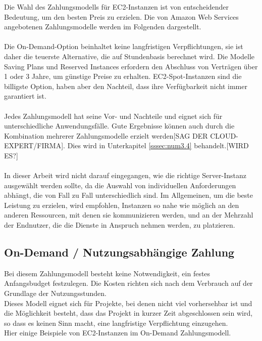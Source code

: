 Die Wahl des Zahlungsmodells für EC2-Instanzen ist von entscheidender Bedeutung, um den besten Preis zu erzielen.
Die von Amazon Web Services angebotenen Zahlungsmodelle werden im Folgenden dargestellt.
\\\\
Die On-Demand-Option %
beinhaltet keine langfristigen Verpflichtungen, sie ist daher die teuerste Alternative, die auf Stundenbasis berechnet wird. Die Modelle Saving Plans und Reserved Instances erfordern den Abschluss von Verträgen über 1 oder 3 Jahre, um günstige Preise zu erhalten. EC2-Spot-Instanzen sind die billigste Option, haben aber den Nachteil, dass ihre Verfügbarkeit nicht immer garantiert ist.
\\\\
Jedes Zahlungsmodell hat seine Vor- und Nachteile und eignet sich für unterschiedliche Anwendungsfälle. Gute Ergebnisse können auch durch die Kombination mehrerer Zahlungsmodelle erzielt werden[SAG DER CLOUD-EXPERT/FIRMA]. Dies wird in Unterkapitel \ref{sssec:num3.4} behandelt.[WIRD ES?]
\\\\
In dieser Arbeit wird nicht darauf eingegangen, wie die richtige Server-Instanz ausgewählt werden sollte, da die Auswahl von individuellen Anforderungen abhängt, die von Fall zu Fall unterschiedlich sind. Im Allgemeinen, um die beste Leistung zu erzielen, wird empfohlen, Instanzen so nahe wie möglich an den anderen Ressourcen, mit denen sie kommunizieren werden, und an der Mehrzahl der Endnutzer, die die Dienste in Anspruch nehmen werden, zu platzieren.

\subsection{On-Demand / Nutzungsabhängige Zahlung}
Bei diesem Zahlungsmodell besteht keine Notwendigkeit, ein festes Anfangsbudget festzulegen. Die Kosten richten sich nach dem Verbrauch auf der Grundlage der Nutzungsstunden.
\\
Dieses Modell eignet sich für Projekte, bei denen nicht viel vorhersehbar ist und die Möglichkeit besteht, dass das Projekt in kurzer Zeit abgeschlossen sein wird, so dass es keinen Sinn macht, eine langfristige Verpflichtung einzugehen.
\\
Hier einige Beispiele von EC2-Instanzen im On-Demand Zahlungsmodell.

